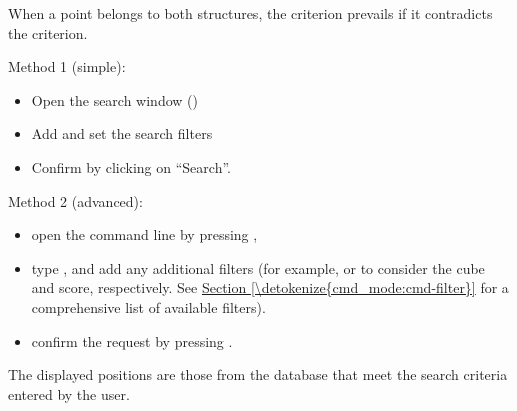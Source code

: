 \documentclass[letterpaper,10pt,english]{sphinxmanual}
\begin{document}
\sphinxAtStartPar
When a point belongs to both structures, the  criterion prevails if it contradicts the  criterion.

\sphinxAtStartPar
Method 1 (simple):
\begin{itemize}
\item {} 
\sphinxAtStartPar
Open the search window ()

\item {} 
\sphinxAtStartPar
Add and set the search filters

\item {} 
\sphinxAtStartPar
Confirm by clicking on “Search”.

\end{itemize}

\sphinxAtStartPar
Method 2 (advanced):
\begin{itemize}
\item {} 
\sphinxAtStartPar
open the command line by pressing ,

\item {} 
\sphinxAtStartPar
type , and add any additional filters (for example,  or  to consider the cube and score, respectively. See \hyperref[\detokenize{cmd_mode:cmd-filter}]{Section \ref{\detokenize{cmd_mode:cmd-filter}}} for a comprehensive list of available filters).

\item {} 
\sphinxAtStartPar
confirm the request by pressing .

\end{itemize}

\sphinxAtStartPar
The displayed positions are those from the database that meet the search criteria entered by the user.
\end{document}
